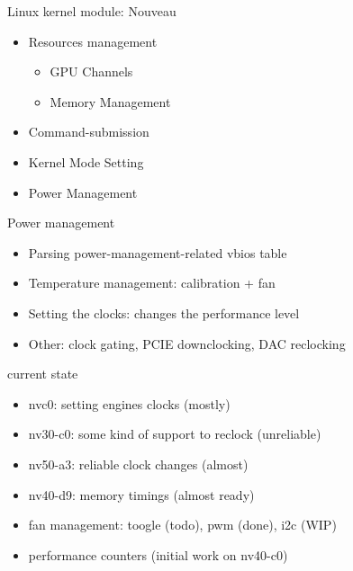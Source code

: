 \documentclass[11pt,english,compress]{beamer}
\begin{document}
		\begin{frame}
			\begin{block}{Linux kernel module: Nouveau}
				\begin{itemize}
					\item Resources management
						\begin{itemize}
							\item GPU Channels
							\item Memory Management
						\end{itemize}
					\item Command-submission
					\item Kernel Mode Setting
					\item Power Management
				\end{itemize}
			\end{block}
		\end{frame}

		\begin{frame}
			\begin{block}{Power management}
 				\begin{itemize}
					\item Parsing power-management-related vbios table
					\item Temperature management: calibration + fan
					\item Setting the clocks: changes the performance level
					\item Other: clock gating, PCIE downclocking, DAC reclocking
				\end{itemize}
			\end{block}

			\begin{block}{current state}
				\begin{itemize}
					\item nvc0: setting engines clocks (mostly)
					\item nv30-c0: some kind of support to reclock (unreliable)
					\item nv50-a3: reliable clock changes (almost)
					\item nv40-d9: memory timings (almost ready)
					\item fan management: toogle (todo), pwm (done), i2c (WIP)
					\item performance counters (initial work on nv40-c0)
				\end{itemize}
			\end{block}
		\end{frame}
\end{document}
